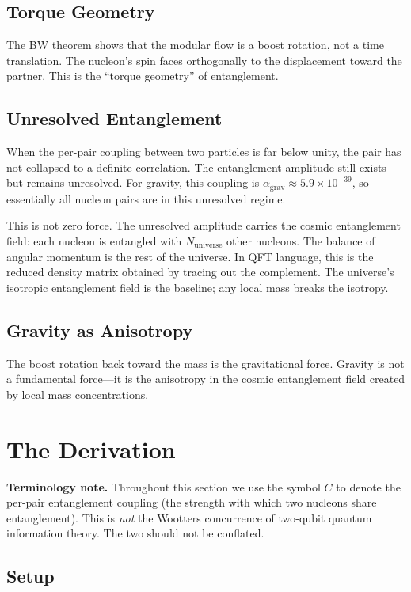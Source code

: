 \documentclass[11pt,letterpaper]{article}
\begin{document}
\subsection{Torque Geometry}

The BW theorem shows that the modular flow is a boost rotation, not a time
translation. The nucleon's spin faces orthogonally to the displacement toward
the partner. This is the ``torque geometry'' of entanglement.

\subsection{Unresolved Entanglement}

When the per-pair coupling between two particles is far below unity, the pair
has not collapsed to a definite correlation. The entanglement amplitude still
exists but remains unresolved. For gravity, this coupling is
$\alpha_{\mathrm{grav}} \approx 5.9 \times 10^{-39}$, so essentially all
nucleon pairs are in this unresolved regime.

This is not zero force. The unresolved amplitude carries the cosmic
entanglement field: each nucleon is entangled with $N_{\mathrm{universe}}$
other nucleons. The balance of angular momentum is the rest of the universe.
In QFT language, this is the reduced density matrix obtained by tracing out
the complement. The universe's isotropic entanglement field is the baseline;
any local mass breaks the isotropy.

\subsection{Gravity as Anisotropy}

The boost rotation back toward the mass is the gravitational force. Gravity
is not a fundamental force---it is the anisotropy in the cosmic entanglement
field created by local mass concentrations.

\section{The Derivation}

\textbf{Terminology note.} Throughout this section we use the symbol $C$ to
denote the per-pair entanglement coupling (the strength with which two
nucleons share entanglement). This is \emph{not} the Wootters concurrence
of two-qubit quantum information theory. The two should not be conflated.

\subsection{Setup}
\end{document}
